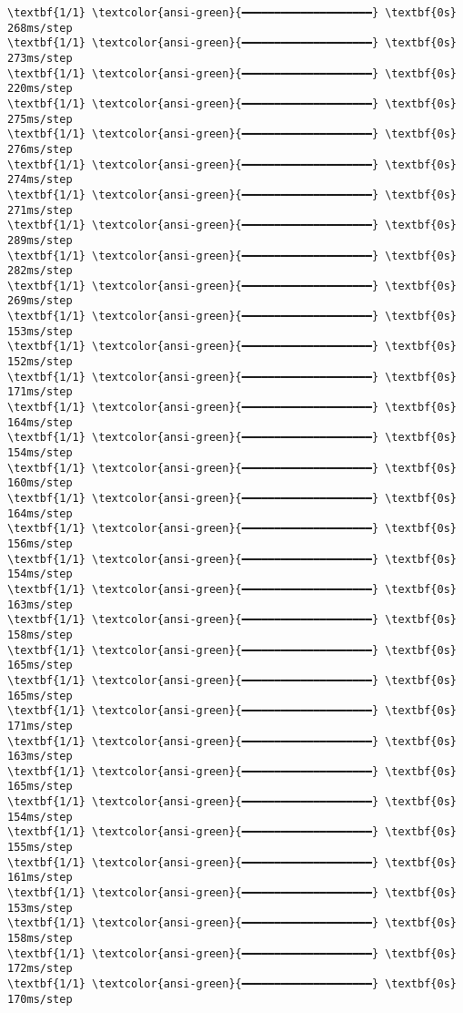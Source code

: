 \documentclass[11pt]{article}
\begin{document}
\begin{Verbatim}[commandchars=\\\{\}]
\textbf{1/1} \textcolor{ansi-green}{━━━━━━━━━━━━━━━━━━━━} \textbf{0s} 268ms/step
\textbf{1/1} \textcolor{ansi-green}{━━━━━━━━━━━━━━━━━━━━} \textbf{0s} 273ms/step
\textbf{1/1} \textcolor{ansi-green}{━━━━━━━━━━━━━━━━━━━━} \textbf{0s} 220ms/step
\textbf{1/1} \textcolor{ansi-green}{━━━━━━━━━━━━━━━━━━━━} \textbf{0s} 275ms/step
\textbf{1/1} \textcolor{ansi-green}{━━━━━━━━━━━━━━━━━━━━} \textbf{0s} 276ms/step
\textbf{1/1} \textcolor{ansi-green}{━━━━━━━━━━━━━━━━━━━━} \textbf{0s} 274ms/step
\textbf{1/1} \textcolor{ansi-green}{━━━━━━━━━━━━━━━━━━━━} \textbf{0s} 271ms/step
\textbf{1/1} \textcolor{ansi-green}{━━━━━━━━━━━━━━━━━━━━} \textbf{0s} 289ms/step
\textbf{1/1} \textcolor{ansi-green}{━━━━━━━━━━━━━━━━━━━━} \textbf{0s} 282ms/step
\textbf{1/1} \textcolor{ansi-green}{━━━━━━━━━━━━━━━━━━━━} \textbf{0s} 269ms/step
\textbf{1/1} \textcolor{ansi-green}{━━━━━━━━━━━━━━━━━━━━} \textbf{0s} 153ms/step
\textbf{1/1} \textcolor{ansi-green}{━━━━━━━━━━━━━━━━━━━━} \textbf{0s} 152ms/step
\textbf{1/1} \textcolor{ansi-green}{━━━━━━━━━━━━━━━━━━━━} \textbf{0s} 171ms/step
\textbf{1/1} \textcolor{ansi-green}{━━━━━━━━━━━━━━━━━━━━} \textbf{0s} 164ms/step
\textbf{1/1} \textcolor{ansi-green}{━━━━━━━━━━━━━━━━━━━━} \textbf{0s} 154ms/step
\textbf{1/1} \textcolor{ansi-green}{━━━━━━━━━━━━━━━━━━━━} \textbf{0s} 160ms/step
\textbf{1/1} \textcolor{ansi-green}{━━━━━━━━━━━━━━━━━━━━} \textbf{0s} 164ms/step
\textbf{1/1} \textcolor{ansi-green}{━━━━━━━━━━━━━━━━━━━━} \textbf{0s} 156ms/step
\textbf{1/1} \textcolor{ansi-green}{━━━━━━━━━━━━━━━━━━━━} \textbf{0s} 154ms/step
\textbf{1/1} \textcolor{ansi-green}{━━━━━━━━━━━━━━━━━━━━} \textbf{0s} 163ms/step
\textbf{1/1} \textcolor{ansi-green}{━━━━━━━━━━━━━━━━━━━━} \textbf{0s} 158ms/step
\textbf{1/1} \textcolor{ansi-green}{━━━━━━━━━━━━━━━━━━━━} \textbf{0s} 165ms/step
\textbf{1/1} \textcolor{ansi-green}{━━━━━━━━━━━━━━━━━━━━} \textbf{0s} 165ms/step
\textbf{1/1} \textcolor{ansi-green}{━━━━━━━━━━━━━━━━━━━━} \textbf{0s} 171ms/step
\textbf{1/1} \textcolor{ansi-green}{━━━━━━━━━━━━━━━━━━━━} \textbf{0s} 163ms/step
\textbf{1/1} \textcolor{ansi-green}{━━━━━━━━━━━━━━━━━━━━} \textbf{0s} 165ms/step
\textbf{1/1} \textcolor{ansi-green}{━━━━━━━━━━━━━━━━━━━━} \textbf{0s} 154ms/step
\textbf{1/1} \textcolor{ansi-green}{━━━━━━━━━━━━━━━━━━━━} \textbf{0s} 155ms/step
\textbf{1/1} \textcolor{ansi-green}{━━━━━━━━━━━━━━━━━━━━} \textbf{0s} 161ms/step
\textbf{1/1} \textcolor{ansi-green}{━━━━━━━━━━━━━━━━━━━━} \textbf{0s} 153ms/step
\textbf{1/1} \textcolor{ansi-green}{━━━━━━━━━━━━━━━━━━━━} \textbf{0s} 158ms/step
\textbf{1/1} \textcolor{ansi-green}{━━━━━━━━━━━━━━━━━━━━} \textbf{0s} 172ms/step
\textbf{1/1} \textcolor{ansi-green}{━━━━━━━━━━━━━━━━━━━━} \textbf{0s} 170ms/step

\end{Verbatim}
\end{document}
